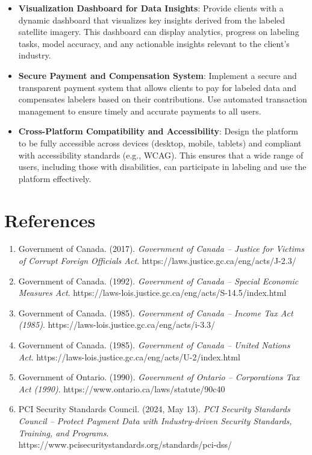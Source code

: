 \documentclass[12pt]{article}
\begin{document}
\begin{itemize}
    \item \textbf{Visualization Dashboard for Data Insights}: Provide clients with a dynamic dashboard that visualizes key insights derived from the labeled satellite imagery. This dashboard can display analytics, progress on labeling tasks, model accuracy, and any actionable insights relevant to the client’s industry.
    
    \item \textbf{Secure Payment and Compensation System}: Implement a secure and transparent payment system that allows clients to pay for labeled data and compensates labelers based on their contributions. Use automated transaction management to ensure timely and accurate payments to all users.
    
    \item \textbf{Cross-Platform Compatibility and Accessibility}: Design the platform to be fully accessible across devices (desktop, mobile, tablets) and compliant with accessibility standards (e.g., WCAG). This ensures that a wide range of users, including those with disabilities, can participate in labeling and use the platform effectively.
\end{itemize}

\newpage{}
\section*{References}
\begin{enumerate}
    \item Government of Canada. (2017). \textit{Government of Canada – Justice for Victims of Corrupt Foreign Officials Act}. https://laws.justice.gc.ca/eng/acts/J-2.3/
    \item Government of Canada. (1992). \textit{Government of Canada – Special Economic Measures Act}. https://laws-lois.justice.gc.ca/eng/acts/S-14.5/index.html
    \item Government of Canada. (1985). \textit{Government of Canada – Income Tax Act (1985)}. https://laws-lois.justice.gc.ca/eng/acts/i-3.3/
    \item Government of Canada. (1985). \textit{Government of Canada – United Nations Act}. https://laws-lois.justice.gc.ca/eng/acts/U-2/index.html
    \item Government of Ontario. (1990). \textit{Government of Ontario – Corporations Tax Act (1990)}. https://www.ontario.ca/laws/statute/90c40
    \item PCI Security Standards Council. (2024, May 13). \textit{PCI Security Standards Council – Protect Payment Data with Industry-driven Security Standards, Training, and Programs}. https://www.pcisecuritystandards.org/standards/pci-dss/
\end{enumerate}
\end{document}
